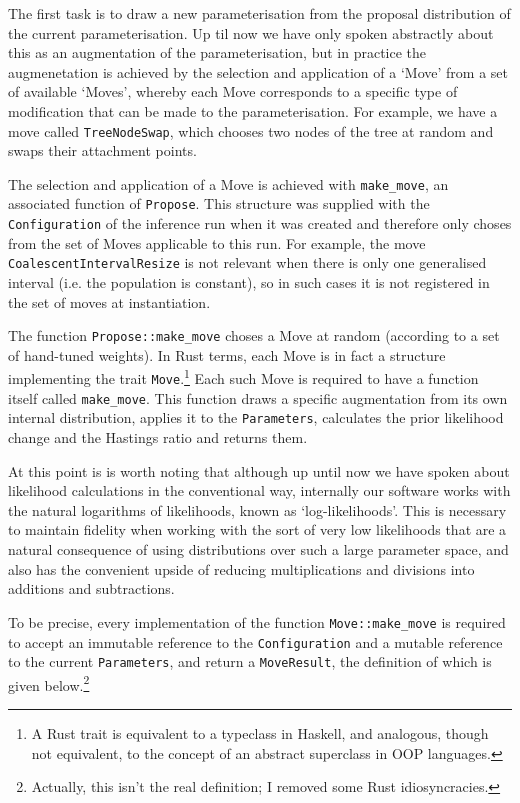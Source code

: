 \documentclass[10pt,journal,compsoc]{IEEEtran}
\begin{document}
The first task is to draw a new parameterisation from the proposal distribution of the current parameterisation. Up til now we have only spoken abstractly about this as an augmentation of the parameterisation, but in practice the augmenetation is achieved by the selection and application of a `Move' from a set of available `Moves', whereby each Move corresponds to a specific type of modification that can be made to the parameterisation. For example, we have a move called \texttt{TreeNodeSwap}, which chooses two nodes of the tree at random and swaps their attachment points.

The selection and application of a Move is achieved with \texttt{make\_move}, an associated function of \texttt{Propose}. This structure was supplied with the \texttt{Configuration} of the inference run when it was created and therefore only choses from the set of Moves applicable to this run. For example, the move \texttt{CoalescentIntervalResize} is not relevant when there is only one generalised interval (i.e. the population is constant), so in such cases it is not registered in the set of moves at instantiation.

The function \texttt{Propose::make\_move} choses a Move at random (according to a set of hand-tuned weights). In Rust terms, each Move is in fact a structure implementing the trait \texttt{Move}.\footnote{A Rust trait is equivalent to a typeclass in Haskell, and analogous, though not equivalent, to the concept of an abstract superclass in OOP languages.} Each such Move is required to have a function itself called \texttt{make\_move}. This function draws a specific augmentation from its own internal distribution, applies it to the \texttt{Parameters}, calculates the prior likelihood change and the Hastings ratio and returns them.

At this point is is worth noting that although up until now we have spoken about likelihood calculations in the conventional way, internally our software works with the natural logarithms of likelihoods, known as `log-likelihoods'. This is necessary to maintain fidelity when working with the sort of very low likelihoods that are a natural consequence of using distributions over such a large parameter space, and also has the convenient upside of reducing multiplications and divisions into additions and subtractions.

To be precise, every implementation of the function \texttt{Move::make\_move} is required to accept an immutable reference to the \texttt{Configuration} and a mutable reference to the current \texttt{Parameters}, and return a \texttt{MoveResult}, the definition of which is given below.\footnote{Actually, this isn't the real definition; I removed some Rust idiosyncracies.}
\end{document}
